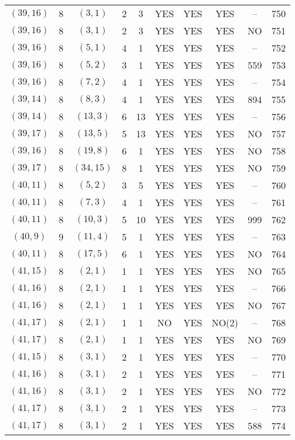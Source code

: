\begin{longtable}{|c|c|c|c|c|c|c|c|c|c|}
$(39, 16)$ & 8 & $(3, 1)$ & 2 & 3 & YES & YES & YES & -- & 750\\
$(39, 16)$ & 8 & $(3, 1)$ & 2 & 3 & YES & YES & YES & NO & 751\\
$(39, 16)$ & 8 & $(5, 1)$ & 4 & 1 & YES & YES & YES & -- & 752\\
$(39, 16)$ & 8 & $(5, 2)$ & 3 & 1 & YES & YES & YES & 559 & 753\\
$(39, 16)$ & 8 & $(7, 2)$ & 4 & 1 & YES & YES & YES & -- & 754\\
$(39, 14)$ & 8 & $(8, 3)$ & 4 & 1 & YES & YES & YES & 894 & 755\\
$(39, 14)$ & 8 & $(13, 3)$ & 6 & 13 & YES & YES & YES & -- & 756\\
$(39, 17)$ & 8 & $(13, 5)$ & 5 & 13 & YES & YES & YES & NO & 757\\
$(39, 16)$ & 8 & $(19, 8)$ & 6 & 1 & YES & YES & YES & NO & 758\\
$(39, 17)$ & 8 & $(34, 15)$ & 8 & 1 & YES & YES & YES & NO & 759\\
$(40, 11)$ & 8 & $(5, 2)$ & 3 & 5 & YES & YES & YES & -- & 760\\
$(40, 11)$ & 8 & $(7, 3)$ & 4 & 1 & YES & YES & YES & -- & 761\\
$(40, 11)$ & 8 & $(10, 3)$ & 5 & 10 & YES & YES & YES & 999 & 762\\
$(40, 9)$ & 9 & $(11, 4)$ & 5 & 1 & YES & YES & YES & -- & 763\\
$(40, 11)$ & 8 & $(17, 5)$ & 6 & 1 & YES & YES & YES & NO & 764\\
$(41, 15)$ & 8 & $(2, 1)$ & 1 & 1 & YES & YES & YES & NO & 765\\
$(41, 16)$ & 8 & $(2, 1)$ & 1 & 1 & YES & YES & YES & -- & 766\\
$(41, 16)$ & 8 & $(2, 1)$ & 1 & 1 & YES & YES & YES & NO & 767\\
$(41, 17)$ & 8 & $(2, 1)$ & 1 & 1 & NO & YES & NO(2) & -- & 768\\
$(41, 17)$ & 8 & $(2, 1)$ & 1 & 1 & YES & YES & YES & NO & 769\\
$(41, 15)$ & 8 & $(3, 1)$ & 2 & 1 & YES & YES & YES & -- & 770\\
$(41, 16)$ & 8 & $(3, 1)$ & 2 & 1 & YES & YES & YES & -- & 771\\
$(41, 16)$ & 8 & $(3, 1)$ & 2 & 1 & YES & YES & YES & NO & 772\\
$(41, 17)$ & 8 & $(3, 1)$ & 2 & 1 & YES & YES & YES & -- & 773\\
$(41, 17)$ & 8 & $(3, 1)$ & 2 & 1 & YES & YES & YES & 588 & 774\\

\end{longtable}
